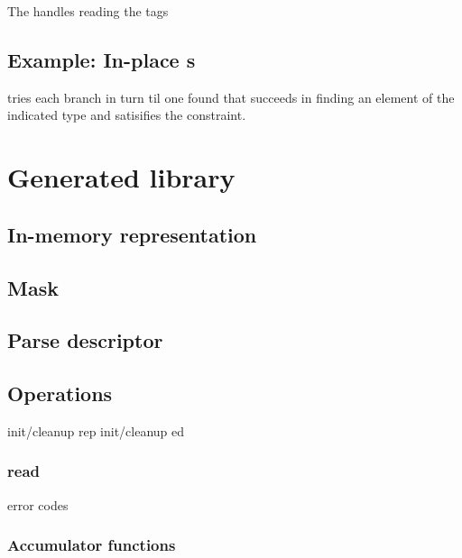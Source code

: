 
The \Pstruct{}  handles reading the tags

\subsection{Example: In-place \Punion{}s}

tries each branch in turn til one found that succeeds in finding an
element of the indicated type and satisifies the constraint.


\section{Generated library}
\subsection{In-memory representation}
\label{sec:unions-rep}
\subsection{Mask}
\label{sec:unions-masks}
\subsection{Parse descriptor}
\label{sec:unions-parse-descriptors}
\subsection{Operations}
init/cleanup rep
init/cleanup ed
\subsubsection{read}
  error codes
\subsubsection{Accumulator functions}

